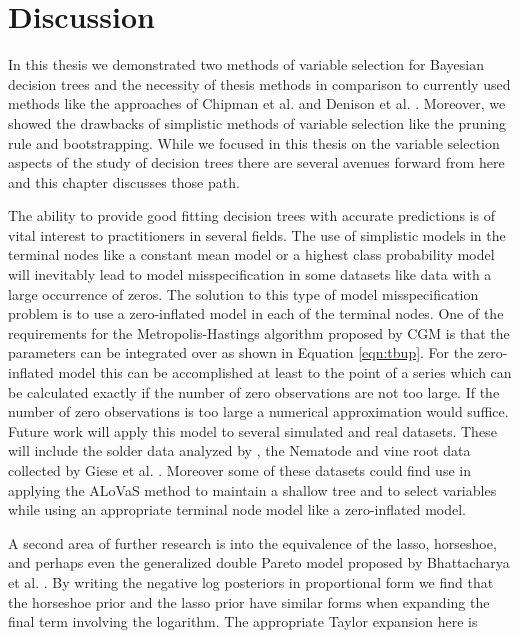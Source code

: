 \section{Discussion}
\label{ch:discuss}
 
In this thesis we demonstrated two methods of variable selection for Bayesian decision trees and the necessity of thesis methods in comparison to currently used methods like the approaches of Chipman et al. \cite{chipman1998bayesian} and Denison et al. \cite{denison1998bayesian}. Moreover, we showed the drawbacks of simplistic methods of variable selection like the pruning rule and bootstrapping. While we focused in this thesis on the variable selection aspects of the study of decision trees there are several avenues forward from here and this chapter discusses those path. 

The ability to provide good fitting decision trees with accurate predictions is of vital interest to practitioners in several fields. The use of simplistic models in the terminal nodes like a constant mean model or a highest class probability model will inevitably lead to model misspecification in some datasets like data with a large occurrence of zeros. The solution to this type of model misspecification problem is to use a zero-inflated model in each of the terminal nodes. One of the requirements for the Metropolis-Hastings algorithm proposed by CGM is that the parameters can be integrated over as shown in Equation \ref{eqn:tbup}. For the zero-inflated model this can be accomplished at least to the point of a series which can be calculated exactly if the number of zero observations are not too large. If the number of zero observations is too large a numerical approximation would suffice. Future work will apply this model to several simulated and real datasets. These will include the solder data analyzed by \cite{lee2006decision}, the Nematode and vine root data collected by Giese et al. \cite{}. Moreover some of these datasets could find use in applying the ALoVaS method to maintain a shallow tree and to select variables while using an appropriate terminal node model like a zero-inflated model.  

A second area of further research is into the equivalence of the lasso, horseshoe, and perhaps even the generalized double Pareto model proposed by Bhattacharya et al. \cite{bhattacharya2012bayesian}. By writing the negative log posteriors in proportional form we find that the horseshoe prior and the lasso prior have similar forms when expanding the final term involving the logarithm. The appropriate Taylor expansion here is 

